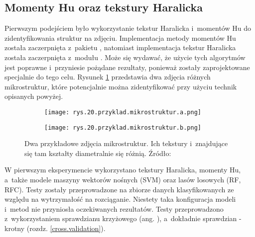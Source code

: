 \subsection{Momenty Hu oraz tekstury Haralicka}
\label{sec:hu_haralick}

Pierwszym podejściem było wykorzystanie tekstur Haralicka i~momentów Hu do zidentyfikowania struktur na zdjęciu. Implementacja metody momentów Hu została zaczerpnięta z~pakietu , natomiast implementacja tekstur Haralicka została zaczerpnięta z~modułu . Może się wydawać, że użycie tych algorytmów jest poprawne i~przyniesie pożądane rezultaty, ponieważ zostały zaprojektowane specjalnie do tego celu. Rysunek \ref{fig:mesh20} przedstawia dwa zdjęcia różnych mikrostruktur, które potencjalnie można zidentyfikować przy użyciu technik opisanych powyżej.
\begin{figure}[h]
	\centering
	\begin{subfigure}{0.47\textwidth}
	    \centering
	    \texttt{[image: rys.20.przyklad.mikrostruktur.a.png]}
	\end{subfigure}
	\begin{subfigure}{0.47\textwidth}
	    \centering
	    \texttt{[image: rys.20.przyklad.mikrostruktur.b.png]}
	\end{subfigure}
	\caption{\label{fig:mesh20}Dwa przykładowe zdjęcia mikrostruktur. Ich tekstury i~znajdujące się tam kształty diametralnie się różnią. Źródło: \cite{Pirowski17}}
\end{figure}
W pierwszym eksperymencie wykorzystano tekstury Haralicka, momenty Hu, a~także modele maszyny wektorów nośnych (SVM) oraz lasów losowych (RF, RFC). Testy zostały przeprowadzone na zbiorze danych klasyfikowanych ze względu na wytrzymałość na rozciąganie. Niestety taka konfiguracja modeli i~metod nie przyniosła oczekiwanych rezultatów. Testy przeprowadzono z~wykorzystaniem sprawdzianu krzyżowego (ang. ), a~dokładnie sprawdzian -krotny (rozdz. \ref{cross.validation}).
